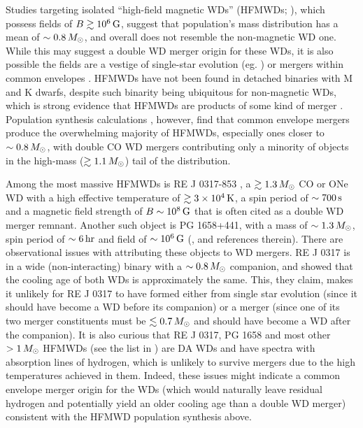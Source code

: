Studies targeting isolated ``high-field magnetic WDs'' (HFMWDs; \citealt{kepl+13, garc+16}), which possess fields of $B \gtrsim10^6\,\mathrm{G}$, suggest that population's mass distribution has a mean of $\sim0.8\,\Msun$, and overall does not resemble the non-magnetic WD one.  While this may suggest a double WD merger origin for these WDs, it is also possible the fields are a vestige of single-star evolution (eg. \citealt{wickf05, kisst15}) or mergers within common envelopes \citep{garc+12, wicktf14, brig+15}.  HFMWDs have not been found in detached binaries with M and K dwarfs, despite such binarity being ubiquitous for non-magnetic WDs, which is strong evidence that HFMWDs are products of some kind of merger \citep{lieb+15, ferrdg15}.  Population synthesis calculations \citep{garc+12, brig+15}, however, find that common envelope mergers produce the overwhelming majority of HFMWDs, especially ones closer to $\sim0.8\,\Msun$, with double CO WD mergers contributing only a minority of objects in the high-mass ($\gtrsim1.1\,\Msun$) tail of the distribution.

Among the most massive HFMWDs is RE J 0317-853 \citep{bars+95, kube+10}, a $\gtrsim1.3\,\Msun$ CO or ONe WD with a high effective temperature of $\gtrsim3\times10^4\,\mathrm{K}$, a spin period of $\sim700\,\mathrm{s}$ and a magnetic field strength of $B\sim10^8\,\mathrm{G}$ that is often cited as a double WD merger remnant.  Another such object is PG 1658+441, with a mass of $\sim1.3\,\Msun$, spin period of $\sim6\,\mathrm{hr}$ and field of $\sim10^6\,\mathrm{G}$ (\citealt{ferrdg15}, and references therein).  There are observational issues with attributing these objects to WD mergers.  RE J 0317 is in a wide (non-interacting) binary with a $\sim0.8\,\Msun$ companion, and \cite{kube+10} showed that the cooling age of both WDs is approximately the same.  This, they claim, makes it unlikely for RE J 0317 to have formed either from single star evolution (since it should have become a WD before its companion) or a merger (since one of its two merger constituents must be $\lesssim0.7\,\Msun$ and should have become a WD after the companion).  It is also curious that RE J 0317, PG 1658 and most other $>1\,\Msun$ HFMWDs (see the list in \citealt{ferrdg15}) are DA WDs and have spectra with absorption lines of hydrogen, which is unlikely to survive mergers due to the high temperatures achieved in them.  Indeed, these issues might indicate a common envelope merger origin for the WDs (which would naturally leave residual hydrogen and potentially yield an older cooling age than a double WD merger) consistent with the HFMWD population synthesis above.

